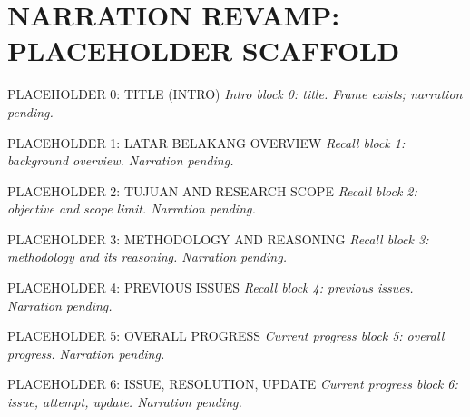 \documentclass[aspectratio=169,11pt]{beamer}
\begin{document}
\section{NARRATION REVAMP: PLACEHOLDER SCAFFOLD}

\begin{frame}{PLACEHOLDER 0: TITLE (INTRO)}
  \small\textit{Intro block 0: title. Frame exists; narration pending.}
\end{frame}

\begin{frame}{PLACEHOLDER 1: LATAR BELAKANG OVERVIEW}
  \small\textit{Recall block 1: background overview. Narration pending.}
\end{frame}

\begin{frame}{PLACEHOLDER 2: TUJUAN AND RESEARCH SCOPE}
  \small\textit{Recall block 2: objective and scope limit. Narration pending.}
\end{frame}

\begin{frame}{PLACEHOLDER 3: METHODOLOGY AND REASONING}
  \small\textit{Recall block 3: methodology and its reasoning. Narration pending.}
\end{frame}

\begin{frame}{PLACEHOLDER 4: PREVIOUS ISSUES}
  \small\textit{Recall block 4: previous issues. Narration pending.}
\end{frame}

\begin{frame}{PLACEHOLDER 5: OVERALL PROGRESS}
  \small\textit{Current progress block 5: overall progress. Narration pending.}
\end{frame}

\begin{frame}{PLACEHOLDER 6: ISSUE, RESOLUTION, UPDATE}
  \small\textit{Current progress block 6: issue, attempt, update. Narration pending.}
\end{frame}
\end{document}
